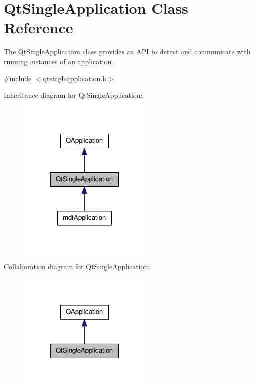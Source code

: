 \hypertarget{class_qt_single_application}{\section{Qt\-Single\-Application Class Reference}
\label{class_qt_single_application}
}


The \hyperlink{class_qt_single_application}{Qt\-Single\-Application} class provides an A\-P\-I to detect and communicate with running instances of an application.  




{\ttfamily \#include $<$qtsingleapplication.\-h$>$}



Inheritance diagram for Qt\-Single\-Application\-:\nopagebreak
\begin{figure}[H]
\begin{center}
\leavevmode
\includegraphics[width=182pt]{class_qt_single_application__inherit__graph}
\end{center}
\end{figure}


Collaboration diagram for Qt\-Single\-Application\-:\nopagebreak
\begin{figure}[H]
\begin{center}
\leavevmode
\includegraphics[width=182pt]{class_qt_single_application__coll__graph}
\end{center}
\end{figure}
